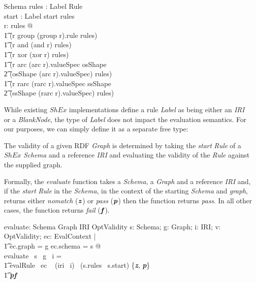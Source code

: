 \documentclass[fuzz]{llncs}
\def\entryFor{\cdot}
\def\pass{\textbf{\textit{p}}}
\def\fail{\textbf{\textit{f}}}
\def\nomatch{\textbf{\textit{z}}}
\def\zc{\textit}
\begin{document}
\begin{schema}{Schema}
   rules : Label \pfun Rule \\
   start : Label
\where
   start \in \dom rules \\
\forall r: \ran rules @ \\
\t1 (r \in \ran group \implies (group \entryFor r).rule \in \dom rules) \land \\
\t1 (r \in \ran and \implies \ran (and \entryFor r) \subseteq \dom rules) \land \\
\t1 (r \in \ran xor \implies \ran (xor \entryFor r) \subseteq \dom rules) \land \\ 
\t1 (r \in \ran arc \land (arc \entryFor r).valueSpec \in \ran osShape \implies \\
\t2 (osShape \entryFor (arc \entryFor r).valueSpec) \in \dom rules) \land \\
\t1 (r \in \ran rarc \land (rarc \entryFor r).valueSpec \in \ran ssShape \implies \\
\t2 (ssShape \entryFor (rarc \entryFor r).valueSpec) \in \dom rules)
\end{schema}


While existing $ShEx$ implementations define a rule \zc{Label} as being either an \zc{IRI} or
a \zc{BlankNode}, the type of \zc{Label} does not impact the evaluation semantics.  For our 
purposes, we can simply define it as a separate free type:
\begin{zed}
[Label]
\end{zed}

The validity of a given RDF \zc{Graph} is determined by taking the \zc{start} \zc{Rule} of a
$ShEx$ \zc{Schema} and a reference \zc{IRI} and evaluating the validity of the \zc{Rule} against the supplied graph. 

Formally, the \zc{evaluate} function takes a \zc{Schema}, a \zc{Graph} and a reference \zc{IRI}
and, if the \zc{start} \zc{Rule} in the \zc{Schema}, 
in the context of the starting \zc{Schema} and \zc{graph}, returns either \zc{nomatch} 
($\nomatch$) or \zc{pass} ($\pass$) then the function returns \zc{pass}.  In all other cases,
the function returns \zc{fail} ($\fail$).
\begin{gendef}
   evaluate: Schema \fun Graph \fun IRI \fun OptValidity
\where
   \forall s: Schema; g: Graph; i: IRI; v: OptValidity; ec: EvalContext | \\
\t1 ec.graph = g \land ec.schema = s @ \\
   evaluate ~s ~g ~i = \\
\t1 \IF evalRule ~ec ~ (iri~ i)~ (s.rules~ s.start) \in \{\nomatch, \pass\} \\
\t1 \THEN \pass \ELSE \fail
\end{gendef}
\end{document}
